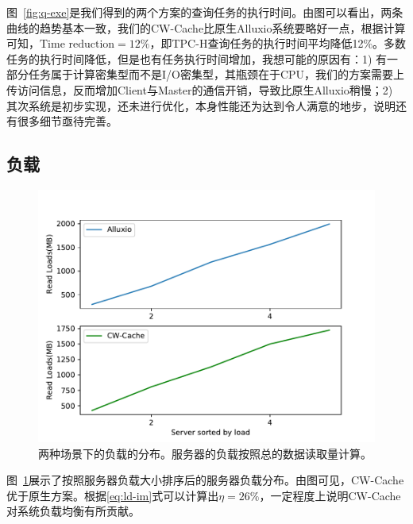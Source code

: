 \par 图~\ref{fig:q-exe}是我们得到的两个方案的查询任务的执行时间。由图可以看出，两条曲线的趋势基本一致，我们的CW-Cache比原生Alluxio系统要略好一点，根据计算可知，$\textstyle \text{Time reduction} = 12\%$，即TPC-H查询任务的执行时间平均降低12\%。多数任务的执行时间降低，但是也有任务执行时间增加，我想可能的原因有：1) 有一部分任务属于计算密集型而不是I/O密集型，其瓶颈在于CPU，我们的方案需要上传访问信息，反而增加Client与Master的通信开销，导致比原生Alluxio稍慢；2) 其次系统是初步实现，还未进行优化，本身性能还为达到令人满意的地步，说明还有很多细节亟待完善。

\subsection{负载}

\begin{figure}[ht]
	\centering
	\includegraphics[width=0.70\paperwidth]{img/evaluation/server-load}
	\caption{两种场景下的负载的分布。服务器的负载按照总的数据读取量计算。}
	\label{fig:server-load}
\end{figure}

\par 图~\ref{fig:server-load}展示了按照服务器负载大小排序后的服务器负载分布。由图可见，CW-Cache优于原生方案。根据\eqref{eq:ld-im}式可以计算出$\eta = 26\%$，一定程度上说明CW-Cache对系统负载均衡有所贡献。

